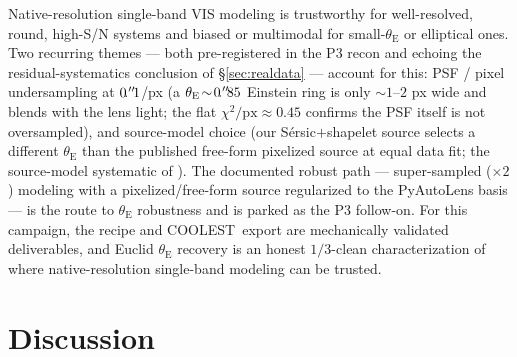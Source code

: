 \documentclass[11pt,letterpaper]{article}
\newcommand{\thetaE}{\ensuremath{\theta_{\mathrm{E}}}}
\newcommand{\coolest}{\textsc{COOLEST}}
\begin{document}
Native-resolution single-band VIS modeling is trustworthy for well-resolved,
round, high-S/N systems and biased or multimodal for small-$\thetaE$ or
elliptical ones. Two recurring themes --- both pre-registered in the P3 recon and
echoing the residual-systematics conclusion of \S\ref{sec:realdata} --- account
for this: PSF / pixel undersampling at $0\mbox{$\!\!\,.{}^{\prime\prime}\!\!\,$}1$/px (a $\thetaE\!\sim\!0\farcs85$
Einstein ring is only $\sim$$1$--$2$ px wide and blends with the lens light; the
flat $\chi^2/\mathrm{px}\approx0.45$ confirms the PSF itself is not
oversampled), and source-model choice (our S\'ersic$+$shapelet source selects a
different $\thetaE$ than the published free-form pixelized source at equal data
fit; the source-model systematic of \citet{etherington2024codecomparison}). The
documented robust path --- super-sampled ($\times2$) modeling with a
pixelized/free-form source regularized to the PyAutoLens basis --- is the route
to $\thetaE$ robustness and is parked as the P3 follow-on. For this campaign, the
recipe and \coolest\ export are mechanically validated deliverables, and Euclid
$\thetaE$ recovery is an honest $1/3$-clean characterization of where
native-resolution single-band modeling can be trusted.

\section{Discussion}
\label{sec:discussion}
\end{document}
